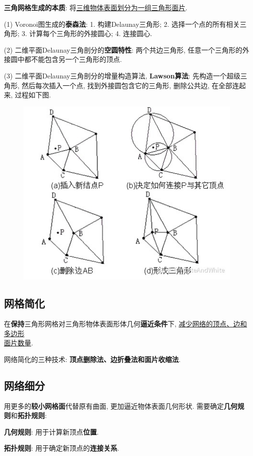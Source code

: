 \documentclass[12pt, a4paper, oneside]{ctexart}
\def\ul{\underline}         %
\def\bf{\textbf}            %
\begin{document}
\bf{三角网格生成的本质}: 将\ul{三维物体表面划分为一组三角形面片}.

(1) Voronoi图生成的\bf{泰森法}: 1. 构建Delaunay三角形; 2. 选择一个点的所有相关三角形; 3. 计算每个三角形的外接圆心; 4. 连接圆心.

(2) 二维平面Delaunay三角剖分的\bf{空圆特性}: 两个共边三角形, 任意一个三角形的外接圆中都不能包含另一个三角形的顶点.

(3) 二维平面Delaunay三角剖分的增量构造算法, \bf{Lawson算法}: 先构造一个超级三角形, 然后每次插入一个点, 找到外接圆包含它的三角形, 删除公共边, 在全部连起来, 过程如下图.
\begin{figure}[htbp]
    \centering
    \includegraphics[scale=0.6]{lawson.jpg}
\end{figure}

\subsection{网格简化}
在\bf{保持}三角形网格对三角形物体表面形体几何\bf{逼近条件}下, \ul{减少网络的顶点、边和多边形}\\\ul{面片数量}.

网络简化的三种技术: \bf{顶点删除法、边折叠法和面片收缩法}.

\subsection{网络细分}
用更多的\bf{较小网格面}代替原有曲面, 更加逼近物体表面几何形状. 需要确定\bf{几何规则}和\bf{拓扑规则}:

\bf{几何规则}: 用于计算新顶点\bf{位置}.

\bf{拓扑规则}: 用于确定新顶点的\bf{连接关系}.
\end{document}
